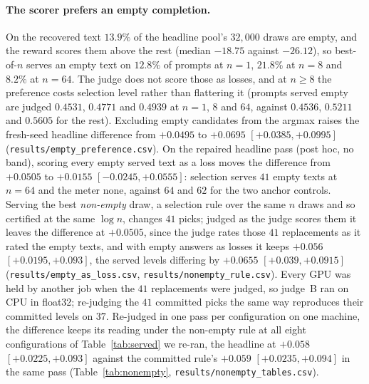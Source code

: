 \paragraph{The scorer prefers an empty completion.}\label{app:empties}
On the recovered text $13.9\%$ of the headline pool's $32{,}000$ draws are empty, and the reward scores them
above the rest (median $-18.75$ against $-26.12$), so best-of-$n$ serves an empty text on $12.8\%$ of prompts
at $n=1$, $21.8\%$ at $n=8$ and $8.2\%$ at $n=64$. The judge does not score those as losses, and at $n \ge 8$
the preference costs selection level rather than flattering it (prompts served empty are judged $0.4531$, $0.4771$ and $0.4939$ at $n=1$, $8$ and $64$, against $0.4536$, $0.5211$ and $0.5605$ for the rest). Excluding empty candidates from the argmax raises the
fresh-seed headline difference from $+0.0495$ to $+0.0695$ $[+0.0385, +0.0995]$
(\texttt{results/\allowbreak empty\_\allowbreak preference.csv}). On the repaired headline pass (post hoc, no band),
scoring every empty served text as a loss moves the difference from $+0.0505$ to $+0.0155$
$[-0.0245, +0.0555]$: selection serves $41$ empty texts at $n=64$ and the meter none, against $64$ and $62$
for the two anchor controls. Serving the best \emph{non-empty} draw, a selection rule over the same $n$
draws and so certified at the same $\log n$, changes $41$ picks; judged as the judge scores them it leaves
the difference at $+0.0505$, since the judge rates those $41$ replacements as it rated the empty texts,
and with empty answers as losses it keeps $+0.056$ $[+0.0195, +0.093]$, the served levels differing by
$+0.0655$ $[+0.039, +0.0915]$ (\texttt{results/\allowbreak empty\_\allowbreak as\_\allowbreak loss.csv},
\texttt{results/\allowbreak nonempty\_\allowbreak rule.csv}). Every GPU was held by another job when the
$41$ replacements were judged, so judge~B ran on CPU in float32; re-judging the $41$ committed picks the
same way reproduces their committed levels on $37$. Re-judged in one pass per configuration on one machine,
the difference keeps its reading under the non-empty rule at all eight configurations of
Table~\ref{tab:served} we re-ran, the headline at $+0.058$ $[+0.0225, +0.093]$ against the committed
rule's $+0.059$ $[+0.0235, +0.094]$ in the same pass (Table~\ref{tab:nonempty},
\texttt{results/\allowbreak nonempty\_\allowbreak tables.csv}).

